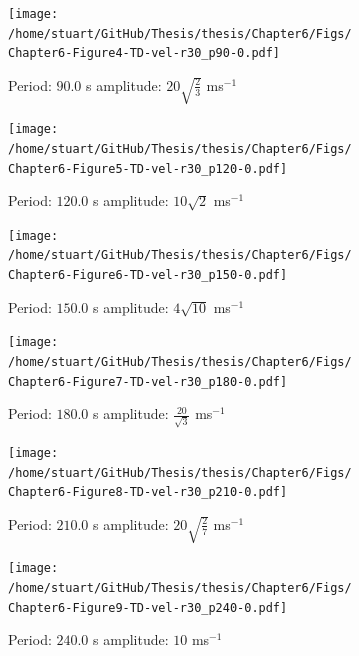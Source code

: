 \documentclass[a4paper,12pt,fourier,authoryear,custommargin]{Classes/PhDThesisPSnPDF}
\begin{document}
\begin{figure}
    \centering
\ContinuedFloat
    

    \begin{subfigure}[b]{0.79\columnwidth}
        \texttt{[image: /home/stuart/GitHub/Thesis/thesis/Chapter6/Figs/Chapter6-Figure4-TD-vel-r30\_p90-0.pdf]}
        \caption{Period: $90.0$ s amplitude: $20\sqrt{\frac{2}{3}}$ ms$^{{-1}}$}
        \label{fig:TD-vel-r30-p90-0}
    \end{subfigure}

    \begin{subfigure}[b]{0.79\columnwidth}
        \texttt{[image: /home/stuart/GitHub/Thesis/thesis/Chapter6/Figs/Chapter6-Figure5-TD-vel-r30\_p120-0.pdf]}
        \caption{Period: $120.0$ s amplitude: $10\sqrt{2}$ ms$^{{-1}}$}
        \label{fig:TD-vel-r30-p120-0}
    \end{subfigure}
    \caption{}
    \label{fig:TD-vel-r30-c}
\end{figure}

\begin{figure}
    \centering
\ContinuedFloat
    

    \begin{subfigure}[b]{0.79\columnwidth}
        \texttt{[image: /home/stuart/GitHub/Thesis/thesis/Chapter6/Figs/Chapter6-Figure6-TD-vel-r30\_p150-0.pdf]}
        \caption{Period: $150.0$ s amplitude: $4\sqrt{10}$ ms$^{{-1}}$}
        \label{fig:TD-vel-r30-p150-0}
    \end{subfigure}

    \begin{subfigure}[b]{0.79\columnwidth}
        \texttt{[image: /home/stuart/GitHub/Thesis/thesis/Chapter6/Figs/Chapter6-Figure7-TD-vel-r30\_p180-0.pdf]}
        \caption{Period: $180.0$ s amplitude: $\frac{20}{\sqrt{3}}$ ms$^{{-1}}$}
        \label{fig:TD-vel-r30-p180-0}
    \end{subfigure}
    \caption{}
    \label{fig:TD-vel-r30-c}
\end{figure}

\begin{figure}
    \centering
\ContinuedFloat
    

    \begin{subfigure}[b]{0.79\columnwidth}
        \texttt{[image: /home/stuart/GitHub/Thesis/thesis/Chapter6/Figs/Chapter6-Figure8-TD-vel-r30\_p210-0.pdf]}
        \caption{Period: $210.0$ s amplitude: $20\sqrt{\frac{2}{7}}$ ms$^{{-1}}$}
        \label{fig:TD-vel-r30-p210-0}
    \end{subfigure}

    \begin{subfigure}[b]{0.79\columnwidth}
        \texttt{[image: /home/stuart/GitHub/Thesis/thesis/Chapter6/Figs/Chapter6-Figure9-TD-vel-r30\_p240-0.pdf]}
        \caption{Period: $240.0$ s amplitude: $10$ ms$^{{-1}}$}
        \label{fig:TD-vel-r30-p240-0}
    \end{subfigure}
    \caption{}
    \label{fig:TD-vel-r30-c}
\end{figure}
\end{document}
